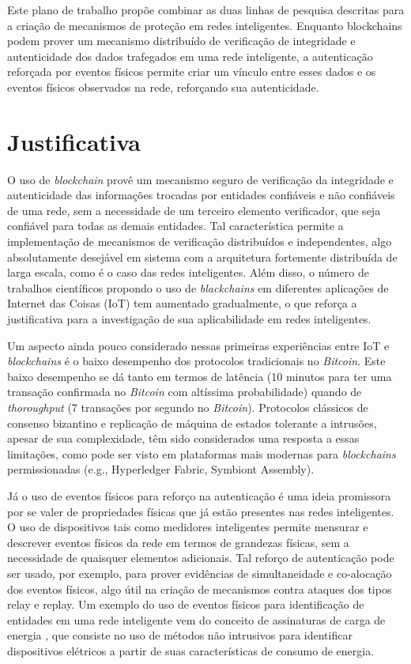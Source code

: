\documentclass[12pt]{article}
\begin{document}
Este plano de trabalho propõe combinar as duas linhas de pesquisa descritas para a criação de mecanismos de proteção em redes inteligentes. Enquanto blockchains podem prover um mecanismo distribuído de verificação de integridade e autenticidade dos dados trafegados em uma rede inteligente, a autenticação reforçada por eventos físicos permite criar um vínculo entre esses dados e os eventos físicos observados na rede, reforçando sua autenticidade.

\section{Justificativa}
\label{justify}
O uso de \textit{blockchain} provê um mecanismo seguro de verificação da integridade e autenticidade das informações trocadas por entidades confiáveis e não confiáveis de uma rede, sem a necessidade de um terceiro elemento verificador, que seja confiável para todas as demais entidades. Tal característica permite a implementação de mecanismos de verificação distribuídos e independentes, algo absolutamente desejável em sistema com a arquitetura fortemente distribuída de larga escala, como é o caso das redes inteligentes. Além disso, o número de trabalhos científicos propondo o uso de \textit{blackchains} em diferentes aplicações de Internet das Coisas (IoT) tem aumentado gradualmente, o que reforça a justificativa para a investigação de sua aplicabilidade em redes inteligentes.

Um aspecto ainda pouco considerado nessas primeiras experiências entre IoT e \textit{blockchains} é o baixo desempenho dos protocolos tradicionais no \textit{Bitcoin}. Este baixo desempenho se dá tanto em termos de latência (10 minutos para ter uma transação confirmada no \textit{Bitcoin} com altíssima probabilidade) quando de \textit{thoroughput} (7 transações por segundo no \textit{Bitcoin}). Protocolos clássicos de consenso bizantino e replicação de máquina de estados tolerante a intrusões, apesar de sua complexidade, têm sido considerados uma resposta a essas limitações, como pode ser visto em plataformas mais modernas para \textit{blockchains} permissionadas (e.g., Hyperledger Fabric, Symbiont Assembly). 

Já o uso de eventos físicos para reforço na autenticação é uma ideia promissora por se valer de propriedades físicas que já estão presentes nas redes inteligentes. O uso de dispositivos tais como medidores inteligentes permite mensurar e descrever eventos físicos da rede em termos de grandezas físicas, sem a necessidade de quaisquer elementos adicionais. Tal reforço de autenticação pode ser usado, por exemplo, para prover evidências de simultaneidade e co-alocação dos eventos físicos, algo útil na criação de mecanismos contra ataques dos tipos relay e replay. Um exemplo do uso de eventos físicos para identificação de entidades em uma rede inteligente vem do conceito de assinaturas de carga de energia \cite{Zoha2012}, que consiste no uso de métodos não intrusivos para identificar dispositivos elétricos a partir de suas características de consumo de energia.
\end{document}
